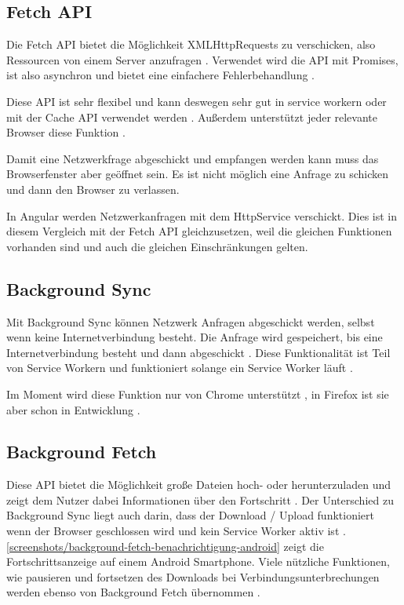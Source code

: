 \subsection{Fetch API}
Die Fetch \ac{API} bietet die Möglichkeit XMLHttpRequests zu verschicken, also Ressourcen von einem Server anzufragen \autocite{Rojas2020}. Verwendet wird die \ac{API} mit Promises, ist also asynchron und bietet eine einfachere Fehlerbehandlung \autocite{Rojas2020} \autocite{mdn-fetch}. 

Diese \ac{API} ist sehr flexibel und kann deswegen sehr gut in service workern oder mit der Cache \ac{API} verwendet werden \autocite{mdn-fetch}. Außerdem unterstützt jeder relevante Browser diese Funktion \autocite{mdn-fetch}. 

Damit eine Netzwerkfrage abgeschickt und empfangen werden kann muss das Browserfenster aber geöffnet sein. Es ist nicht möglich eine Anfrage zu schicken und dann den Browser zu verlassen.

In Angular werden Netzwerkanfragen mit dem HttpService verschickt. Dies ist in diesem Vergleich mit der Fetch \ac{API} gleichzusetzen, weil die gleichen Funktionen vorhanden sind und auch die gleichen Einschränkungen gelten.

\subsection{Background Sync}
Mit Background Sync können Netzwerk Anfragen abgeschickt werden, selbst wenn keine Internetverbindung besteht. Die Anfrage wird gespeichert, bis eine Internetverbindung besteht und dann abgeschickt \autocite{wicg-background-sync}. Diese Funktionalität ist Teil von Service Workern und funktioniert solange ein Service Worker läuft \autocite{wicg-background-sync}. 

Im Moment wird diese Funktion nur von Chrome unterstützt \autocite{caniuse-background-sync}, in Firefox ist sie aber schon in Entwicklung \autocite{status-mozilla-background-sync}.

\subsection{Background Fetch}
Diese \ac{API} bietet die Möglichkeit große Dateien hoch- oder herunterzuladen und zeigt dem Nutzer dabei Informationen über den Fortschritt \autocite{google-background-fetch}. Der Unterschied zu Background Sync liegt auch darin, dass der Download / Upload funktioniert wenn der Browser geschlossen wird und kein Service Worker aktiv ist \autocite{google-background-fetch}. \autoref{screenshots/background-fetch-benachrichtigung-android} zeigt die Fortschrittsanzeige auf einem Android Smartphone. Viele nützliche Funktionen, wie pausieren und fortsetzen des Downloads bei Verbindungsunterbrechungen werden ebenso von Background Fetch übernommen \autocite{google-background-fetch}. 


